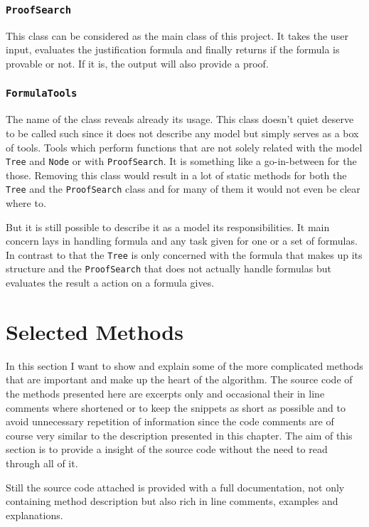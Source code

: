 \subsubsection[ProofSearch]{\texttt{ProofSearch}}
This class can be considered as the main class of this project. It takes the user input, evaluates the justification formula and finally returns if the formula is provable or not. If it is, the output will also provide a proof.

\subsubsection[FormulaTools]{\texttt{FormulaTools}}
The name of the class reveals already its usage. This class doesn't quiet deserve to be called such since it does not describe any model but simply serves as a box of tools. Tools which perform functions that are not solely related with the model \texttt{Tree} and \texttt{Node} or with \texttt{ProofSearch}. It is something like a go-in-between for the those. Removing this class would result in a lot of static methods for both the \texttt{Tree} and the \texttt{ProofSearch} class and for many of them it would not even be clear where to. 

But it is still possible to describe it as a model its responsibilities. It main concern lays in handling formula and any task given for one or a set of formulas. In contrast to that the \texttt{Tree} is only concerned with the formula that makes up its structure and the \texttt{ProofSearch} that does not actually handle formulas but evaluates the result a action on a formula gives.


\section{Selected Methods}
In this section I want to show and explain some of the more complicated methods that are important and make up the heart of the algorithm. The source code of the methods presented here are excerpts only and occasional their in line comments where shortened or to keep the snippets as short as possible and to avoid unnecessary repetition of information since the code comments are of course very similar to the description presented in this chapter. The aim of this section is to provide a insight of the source code without the need to read through all of it. 

Still the source code attached is provided with a full documentation, not only containing method description but also rich in line comments, examples and explanations. 

